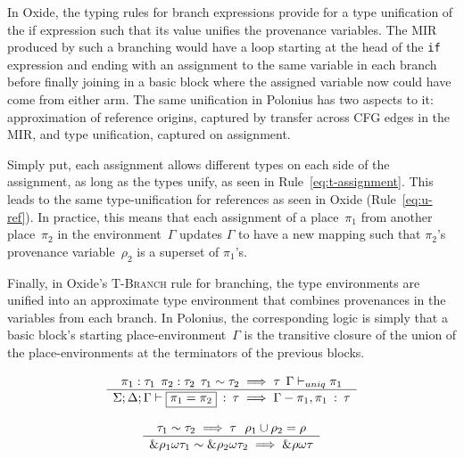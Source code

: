 \documentclass[11pt,a4paper,twoside,openany]{report}
\newcommand{\InRust}[1]{\texttt{#1}}
\newcommand{\expression}[1]{\boxed{#1}}
\newcommand{\ntyperule}[2]{\begin{array}{c}#1\\\hline\raisebox{1pt}{\strut}#2\end{array}}
\begin{document}
In Oxide, the typing rules for branch expressions provide for a type unification
of the if expression such that its value unifies the provenance variables. The
MIR produced by such a branching would have a loop starting at the head of the
\InRust{if} expression and ending with an assignment to the same variable in
each branch before finally joining in a basic block where the assigned variable
now could have come from either arm. The same unification in Polonius has two
aspects to it: approximation of reference origins, captured by transfer across
CFG edges in the MIR, and type unification, captured on assignment.

Simply put, each assignment allows different types on each side of the
assignment, as long as the types unify, as seen in Rule~\eqref{eq:t-assignment}.
This leads to the same type-unification for references as seen in Oxide
(Rule~\eqref{eq:u-ref}). In practice, this means that each assignment of a
place~$\pi_1$ from another place~$\pi_2$ in the environment~$\Gamma$ updates
$\Gamma$ to have a new mapping such that $\pi_2$'s provenance variable~$\rho_2$
is a superset of $\pi_1$'s.

Finally, in Oxide's \textsc{T-Branch} rule for branching, the type environments
are unified into an approximate type environment that combines provenances in
the variables from each branch. In Polonius, the corresponding logic is simply
that a basic block's starting place-environment~$\Gamma$ is the transitive
closure of the union of the place-environments at the terminators of the
previous blocks.

\begin{equation}\label{eq:t-assignment}
  \ntyperule{\pi_1 : \tau_1 \:\: \pi_2 : \tau_2 \:\: \tau_1 \sim \tau_2 \implies \tau \:\: \Gamma \vdash_{uniq} \pi_1}
  {\Sigma ; \Delta ; \Gamma \vdash \expression{\pi_1 = \pi_2} \: : \: \tau \implies \Gamma - \pi_1, \pi_1 \: : \: \tau}
\end{equation}

\begin{equation}\label{eq:u-ref}
  \ntyperule{\tau_1 \sim \tau_2 \implies \tau \:\:\: \rho_1 \cup \rho_2 = \rho}
  {\&\rho_1 \omega \tau_1 \sim \& \rho_2  \omega \tau_2 \implies \&\rho \omega \tau}
\end{equation}
\end{document}
